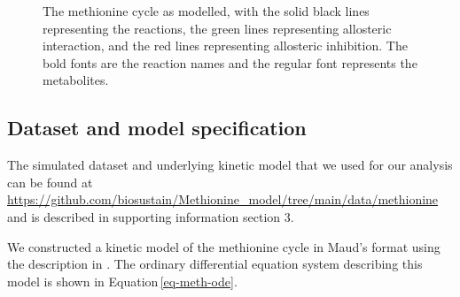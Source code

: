 \documentclass[journal=asbcd6,manuscript=article,layout=traditional]{achemso}
\begin{document}
\begin{figure}

\begin{minipage}[t]{\linewidth}

{\centering 


}

\end{minipage}%

\caption{\label{fig-methionine-reactions}The methionine cycle as
modelled, with the solid black lines representing the reactions, the
green lines representing allosteric interaction, and the red lines
representing allosteric inhibition. The bold fonts are the reaction
names and the regular font represents the metabolites.}

\end{figure}

\hypertarget{dataset-and-model-specification}{%
\subsection{Dataset and model
specification}\label{dataset-and-model-specification}}

The simulated dataset and underlying kinetic model that we used for our
analysis can be found at
\url{https://github.com/biosustain/Methionine_model/tree/main/data/methionine}
and is described in supporting information section 3.

We constructed a kinetic model of the methionine cycle in Maud's format
using the description in \citet{korendyaseva_allosteric_2008}. The
ordinary differential equation system describing this model is shown in
Equation\,\eqref{eq-meth-ode}.
\end{document}
